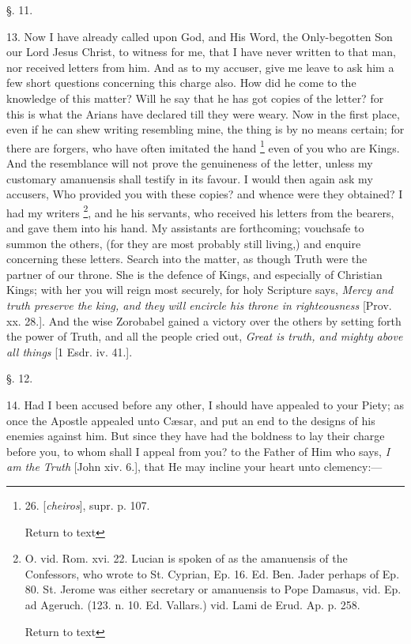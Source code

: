 §. 11.

13. Now I have already called upon God, and His Word, the Only-begotten
Son our Lord Jesus Christ, to witness for me, that I have never
written to that man, nor received letters from him. And as to my
accuser, give me leave to ask him a few short questions concerning
this charge also. How did he come to the knowledge of this matter?
Will he say that he has got copies of the letter? for this is what the
Arians have declared till they were weary. Now in the first place,
even if he can shew writing resembling mine, the thing is by no means
certain; for there are forgers, who have often imitated the hand \footnote{26. [\emph{cheiros}], supr. p. 107.

Return to text} even of you who are Kings. And the resemblance will not
prove the genuineness of the letter, unless my customary amanuensis
shall testify in its favour. I would then again ask my accusers, Who
provided you with these copies? and whence were they obtained? I had
my writers \footnote{O. vid. Rom. xvi. 22. Lucian is spoken of as the amanuensis of the
Confessors, who wrote to St. Cyprian, Ep. 16. Ed. Ben. Jader perhaps
of Ep. 80. St. Jerome was either secretary or amanuensis to Pope
Damasus, vid. Ep. ad Ageruch. (123. n. 10. Ed. Vallars.) vid. Lami de
Erud. Ap. p. 258.

Return to text}, and he his
servants, who received his letters from the bearers, and gave them
into his hand. My assistants are forthcoming; vouchsafe to summon the
others, (for they are most probably still living,) and enquire
concerning these letters. Search into the matter, as though Truth were
the partner of our throne. She is the defence of Kings, and especially
of Christian Kings; with her you will reign most securely, for holy
Scripture says, \emph{Mercy
and truth preserve the king, and they will encircle his throne in
righteousness} [Prov. xx. 28.]. And the wise Zorobabel gained
a victory over the others by setting forth the power of Truth, and all
the people cried out, \emph{Great
is truth, and mighty above all things}
[1 Esdr. iv. 41.].

§. 12.

14. Had I been accused before any other, I should have appealed to your
Piety; as once the Apostle appealed unto Cæsar, and put an end to the
designs of his enemies against him. But since they have had the
boldness to lay their charge before you, to whom shall I appeal from
you? to the Father of Him who says, \emph{I am the Truth} [John xiv. 6.], that He may incline your heart unto
clemency:—

